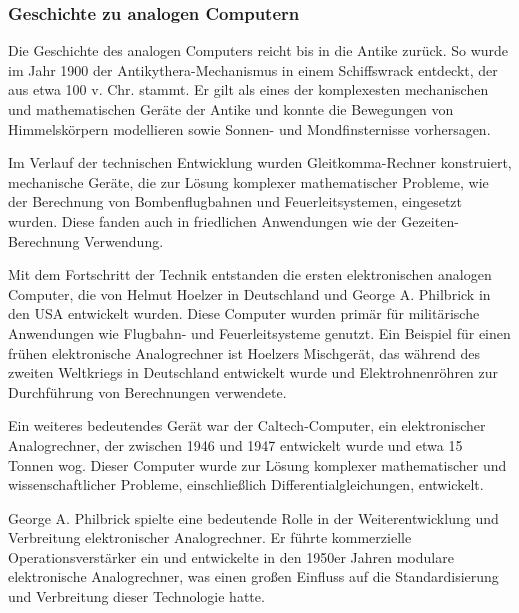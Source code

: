 \subsubsection{Geschichte zu analogen Computern}

Die Geschichte des analogen Computers reicht bis in die Antike zurück. So wurde im Jahr 1900 der Antikythera-Mechanismus in einem Schiffswrack entdeckt, der aus etwa 100 v. Chr. stammt. Er gilt als eines der komplexesten mechanischen und mathematischen Geräte der Antike und konnte die Bewegungen von Himmelskörpern modellieren sowie Sonnen- und Mondfinsternisse vorhersagen. \cite[vgl. S. 9 f.]{Ulmann2022}

Im Verlauf der technischen Entwicklung wurden Gleitkomma-Rechner konstruiert, mechanische Geräte, die zur Lösung komplexer mathematischer Probleme, wie der Berechnung von Bombenflugbahnen und Feuerleitsystemen, eingesetzt wurden. Diese fanden auch in friedlichen Anwendungen wie der Gezeiten-Berechnung Verwendung. \cite[vgl. S. 9]{Ulmann2022}

Mit dem Fortschritt der Technik entstanden die ersten elektronischen analogen Computer, die von Helmut Hoelzer in Deutschland und George A. Philbrick in den USA entwickelt wurden. Diese Computer wurden primär für militärische Anwendungen wie Flugbahn- und Feuerleitsysteme genutzt. Ein Beispiel für einen frühen elektronische Analogrechner ist Hoelzers Mischgerät, das während des zweiten Weltkriegs in Deutschland entwickelt wurde und Elektrohnenröhren zur Durchführung von Berechnungen verwendete. \cite[vgl. S. 41 f.]{Ulmann2022}

Ein weiteres bedeutendes Gerät war der Caltech-Computer, ein elektronischer Analogrechner, der zwischen 1946 und 1947 entwickelt wurde und etwa 15 Tonnen wog. Dieser Computer wurde zur Lösung komplexer mathematischer und wissenschaftlicher Probleme, einschließlich Differentialgleichungen, entwickelt. \cite[vgl. S. 69]{Ulmann2022}

George A. Philbrick spielte eine bedeutende Rolle in der Weiterentwicklung und Verbreitung elektronischer Analogrechner. Er führte kommerzielle Operationsverstärker ein und entwickelte in den 1950er Jahren modulare elektronische Analogrechner, was einen großen Einfluss auf die Standardisierung und Verbreitung dieser Technologie hatte. \cite[vgl. S. 136]{Ulmann2022}
